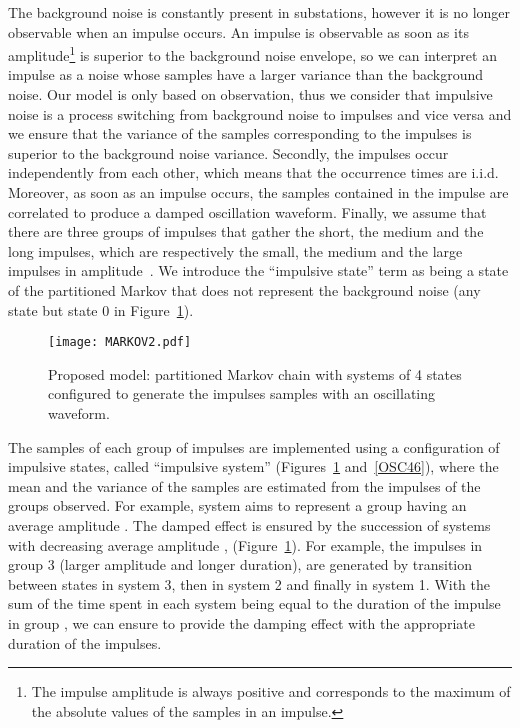 \documentclass[journal]{IEEEtran}
\begin{document}
The background noise is constantly present in substations, however it is no longer observable when an impulse occurs. An impulse is observable as soon as its amplitude\footnote{The impulse amplitude is always positive and corresponds to the maximum of the absolute values of the samples in an impulse.} is superior to the background noise envelope, so we can interpret an impulse as a noise whose samples have a larger variance than the background noise. Our model is only based on observation, thus we consider that impulsive noise is a process switching from background noise to impulses and vice versa and we ensure that the variance of the samples corresponding to the impulses is superior to the background noise variance. Secondly, the impulses occur independently from each other, which means that the occurrence times are i.i.d. Moreover, as soon as an impulse occurs, the samples contained in the impulse are correlated to produce a damped oscillation waveform. Finally, we assume that there are three groups of impulses that gather the short, the medium and the long impulses, which are respectively the small, the medium and the large impulses in amplitude~\cite{cigre}. We introduce the ``impulsive state'' term as being a state of the partitioned Markov that does not represent the background noise (any state but state 0 in Figure~\ref{mc2}).
\begin{figure}[h]
\begin{center}
  \texttt{[image: MARKOV2.pdf]}\\
\end{center}
  \caption{Proposed model: partitioned Markov chain with systems of 4 states configured to generate the impulses samples with an oscillating waveform.}\label{mc2}
\end{figure}
The samples of each group of impulses are implemented using a configuration of impulsive states, called ``impulsive system'' (Figures~\ref{mc2} and~\ref{OSC46}), where the mean and the variance of the samples are estimated from the impulses of the groups observed. For example, system  aims to represent a group  having an average amplitude . The damped effect is ensured by the succession of systems with decreasing average amplitude ,  (Figure~\ref{mc2}). For example, the impulses in group 3 (larger amplitude and longer duration), are generated by transition between states in system 3, then in system 2 and finally in system 1. With the sum of the time spent in each system being equal to the duration of the impulse in group , we can ensure to provide the damping effect with the appropriate duration of the impulses.
\end{document}
